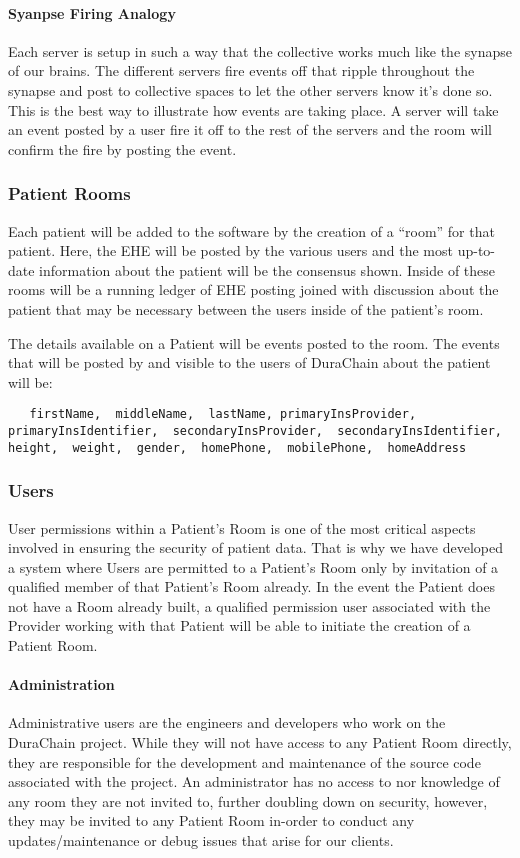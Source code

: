 \documentclass[preprint,pre,floats,aps,amsmath,amssymb]{revtex4-1}
\begin{document}
    \paragraph{Syanpse Firing Analogy}
    Each server is setup in such a way that the collective works much like the synapse of our brains. The different servers fire events off that ripple throughout the synapse and post to collective spaces to let the other servers know it’s done so. This is the best way to illustrate how events are taking place. A server will take an event posted by a user fire it off to the rest of the servers and the room will confirm the fire by posting the event.

  \subsubsection{Patient Rooms}
  Each patient will be added to the software by the creation of a “room” for that patient. Here, the EHE will be posted by the various users and the most up-to-date information about the patient will be the consensus shown. Inside of these rooms will be a running ledger of EHE posting joined with discussion about the patient that may be necessary between the users inside of the patient’s room.

  The details available on a Patient will be events posted to the room. The events that will be posted by and visible to the users of DuraChain about the patient will be:

  \texttt{
  { 
  firstName, 
  middleName, 
  lastName,
  primaryInsProvider,
  primaryInsIdentifier, 
  secondaryInsProvider, 
  secondaryInsIdentifier, 
  height, 
  weight, 
  gender, 
  homePhone, 
  mobilePhone, 
  homeAddress
  }
  }

  \subsubsection{Users}
  User permissions within a Patient’s Room is one of the most critical aspects involved in ensuring the security of patient data. That is why we have developed a system where Users are permitted to a Patient’s Room only by invitation of a qualified member of that Patient’s Room already. In the event the Patient does not have a Room already built, a qualified permission user associated with the Provider working with that Patient will be able to initiate the creation of a Patient Room.

  \paragraph{Administration}
  Administrative users are the engineers and developers who work on the DuraChain project. While they will not have access to any Patient Room directly, they are responsible for the development and maintenance of the source code associated with the project. An administrator has no access to nor knowledge of any room they are not invited to, further doubling down on security, however, they may be invited to any Patient Room in-order to conduct any updates/maintenance or debug issues that arise for our clients.
\end{document}
